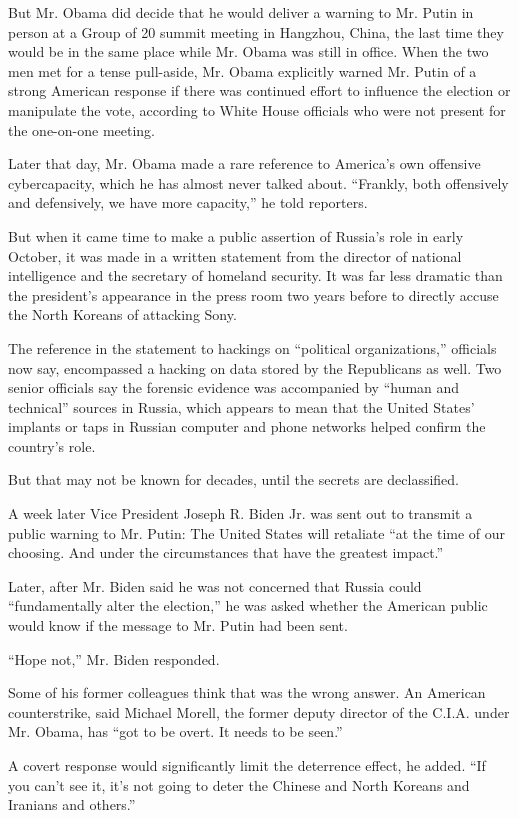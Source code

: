But Mr. Obama did decide that he would deliver a warning to Mr. Putin in
person at a Group of 20 summit meeting in Hangzhou, China, the last time
they would be in the same place while Mr. Obama was still in office.
When the two men met for a tense pull-aside, Mr. Obama explicitly warned
Mr. Putin of a strong American response if there was continued effort to
influence the election or manipulate the vote, according to White House
officials who were not present for the one-on-one meeting.

Later that day, Mr. Obama made a rare reference to America's own
offensive cybercapacity, which he has almost never talked about.
``Frankly, both offensively and defensively, we have more capacity,'' he
told reporters.

But when it came time to make a public assertion of Russia's role in
early October, it was made in a written statement from the director of
national intelligence and the secretary of homeland security. It was far
less dramatic than the president's appearance in the press room two
years before to directly accuse the North Koreans of attacking Sony.

The reference in the statement to hackings on ``political
organizations,'' officials now say, encompassed a hacking on data stored
by the Republicans as well. Two senior officials say the forensic
evidence was accompanied by ``human and technical'' sources in Russia,
which appears to mean that the United States' implants or taps in
Russian computer and phone networks helped confirm the country's role.

But that may not be known for decades, until the secrets are
declassified.

A week later Vice President Joseph R. Biden Jr. was sent out to transmit
a public warning to Mr. Putin: The United States will retaliate ``at the
time of our choosing. And under the circumstances that have the greatest
impact.''

Later, after Mr. Biden said he was not concerned that Russia could
``fundamentally alter the election,'' he was asked whether the American
public would know if the message to Mr. Putin had been sent.

``Hope not,'' Mr. Biden responded.

Some of his former colleagues think that was the wrong answer. An
American counterstrike, said Michael Morell, the former deputy director
of the C.I.A. under Mr. Obama, has ``got to be overt. It needs to be
seen.''

A covert response would significantly limit the deterrence effect, he
added. ``If you can't see it, it's not going to deter the Chinese and
North Koreans and Iranians and others.''

